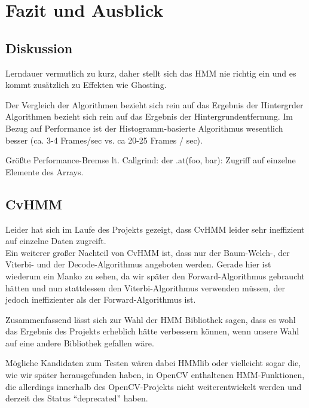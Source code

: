 \section{Fazit und Ausblick}
\label{chap:fazit}
\subsection{Diskussion}
\label{sec:diskuss}
Lerndauer vermutlich zu kurz, daher stellt sich das HMM nie richtig ein und es kommt zusätzlich zu Effekten wie Ghosting.

Der Vergleich der Algorithmen bezieht sich rein auf das Ergebnis der Hintergrder Algorithmen bezieht sich rein auf das Ergebnis der Hintergrundentfernung.
Im Bezug auf Performance ist der Histogramm-basierte Algorithmus wesentlich besser (ca. 3-4 Frames/sec vs. ca 20-25 Frames / sec).

Größte Performance-Bremse lt. Callgrind: der .at(foo, bar): Zugriff auf einzelne Elemente des Arrays.

\subsection{CvHMM}
\label{sec:CvHMM}
Leider hat sich im Laufe des Projekts gezeigt, dass CvHMM leider sehr ineffizient auf einzelne Daten zugreift.\\

Ein weiterer großer Nachteil von CvHMM ist, dass nur der Baum-Welch-, der Viterbi- und der Decode-Algorithmus angeboten werden.
 Gerade hier ist wiederum ein Manko zu sehen, da wir später den Forward-Algorithmus gebraucht hätten und nun stattdessen den Viterbi-Algorithmus verwenden müssen, der jedoch ineffizienter als der Forward-Algorithmus ist.

Zusammenfassend lässt sich zur Wahl der HMM Bibliothek sagen, dass es wohl das Ergebnis des Projekts erheblich hätte verbessern können, wenn unsere Wahl auf eine andere Bibliothek gefallen wäre.

Mögliche Kandidaten zum Testen wären dabei HMMlib oder vielleicht sogar die, wie wir später herausgefunden haben, in OpenCV enthaltenen HMM-Funktionen, die allerdings innerhalb des OpenCV-Projekts nicht weiterentwickelt werden und derzeit des Status “deprecated” haben.


